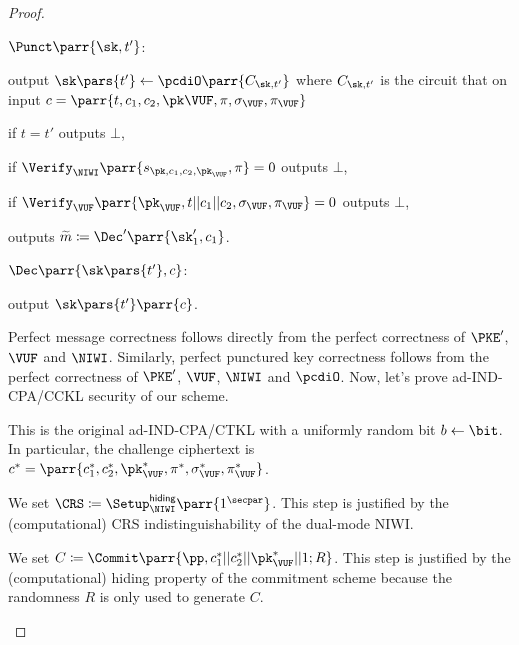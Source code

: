 \begin{proof}
\begin{sitemize}
        \item \(\Punct\parr{\sk,t'}\):
        \begin{sitemize}
            \item output \(\sk\pars{t'} \gets \pcdiO\parr{C_{\sk,t'}}\) where \(C_{\sk,t'}\) is the circuit that on input \(c = \parr{t,c_1,c_2,\pk\VUF,\pi,\sigma_\VUF,\pi_\VUF}\)
            \begin{sitemize}
                \item if \(t=t'\) outputs \(\bot\),
                \item if \(\Verify_\NIWI\parr{s_{\pk,c_1,c_2,\pk_\VUF},\pi} = 0\) outputs \(\bot\),
                \item if \(\Verify_\VUF\parr{\pk_\VUF,t||c_1||c_2,\sigma_\VUF,\pi_\VUF} = 0\) outputs \(\bot\),
                \item outputs \(\widetilde{m} \coloneqq \Dec'\parr{\sk'_1,c_1}\).
            \end{sitemize}
        \end{sitemize}

        \item \(\Dec\parr{\sk\pars{t'},c}\):
        \begin{sitemize}
            \item output \(\sk\pars{t'}\parr{c}\).
        \end{sitemize}
    \end{sitemize}
    Perfect message correctness follows directly from the perfect correctness of \(\PKE'\), \(\VUF\) and \(\NIWI\).
    Similarly, perfect punctured key correctness follows from the perfect correctness of \(\PKE'\), \(\VUF\), \(\NIWI\) and \(\pcdiO\).
    Now, let's prove ad-IND-CPA/CCKL security of our scheme.
    \begin{hybrids}
        \item This is the original ad-IND-CPA/CTKL with a uniformly random bit \(b \gets \bit\).
        In particular, the challenge ciphertext is \(c^* = \parr{c^*_1,c^*_2,\pk^*_\VUF,\pi^*,\sigma^*_\VUF,\pi^*_\VUF}\).

        \item We set \(\CRS \coloneqq \Setup^{\textsf{hiding}}_\NIWI\parr{1^\secpar}\).
        This step is justified by the (computational) CRS indistinguishability of the dual-mode NIWI.

        \item We set \(C \coloneqq \Commit\parr{\pp,c^*_1||c^*_2||\pk^*_\VUF||1;R}\).
        This step is justified by the (computational) hiding property of the commitment scheme because the randomness \(R\) is only used to generate \(C\).


\end{hybrids}
\end{proof}
